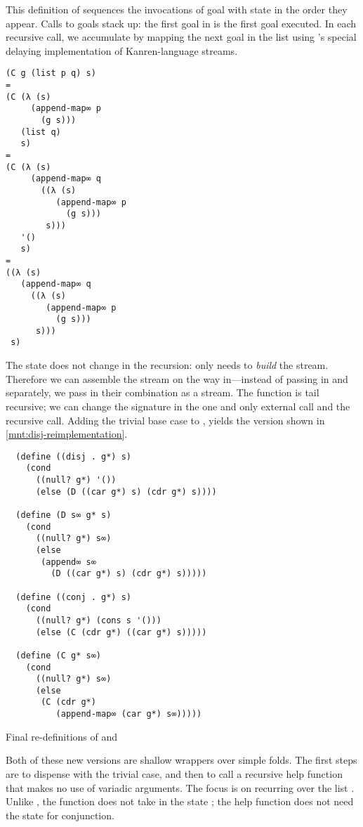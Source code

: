 \documentclass[sigplan,balance=true,pbalance=true,natbib=false]{acmart}
\begin{document}
This definition of  sequences the invocations of goal
with state in the order they appear. Calls to goals stack up: the
first goal in is the first goal executed. In each recursive call, we
accumulate by mapping the next goal in the list using
's special delaying implementation of
Kanren-language streams.

\begin{verbatim}
(C g (list p q) s)
=
(C (λ (s)
     (append-map∞ p
       (g s)))
   (list q)
   s)
=
(C (λ (s)
     (append-map∞ q
       ((λ (s)
          (append-map∞ p
            (g s)))
        s)))
   '()
   s)
=
((λ (s)
   (append-map∞ q
     ((λ (s)
        (append-map∞ p
          (g s)))
      s)))
 s)
\end{verbatim}

The state does not change in the recursion:  only needs
 to \emph{build} the stream. Therefore we can assemble
the stream on the way in---instead of passing in  and
 separately, we pass in their combination as a stream.
The function is tail recursive; we can change the signature in the one
and only external call and the recursive call. Adding the trivial base
case to , yields the version shown in
\cref{mnt:disj-reimplementation}.

\begin{listing}
\begin{verbatim}
  (define ((disj . g*) s)
    (cond
      ((null? g*) '())
      (else (D ((car g*) s) (cdr g*) s))))

  (define (D s∞ g* s)
    (cond
      ((null? g*) s∞)
      (else
       (append∞ s∞
         (D ((car g*) s) (cdr g*) s)))))

  (define ((conj . g*) s)
    (cond
      ((null? g*) (cons s '()))
      (else (C (cdr g*) ((car g*) s)))))

  (define (C g* s∞)
    (cond
      ((null? g*) s∞)
      (else
       (C (cdr g*)
          (append-map∞ (car g*) s∞)))))
\end{verbatim}
  \caption{Final re-definitions of  and }\label{mnt:disj-reimplementation}
\end{listing}

Both of these new versions are shallow wrappers over simple folds. The
first steps are to dispense with the trivial case, and then to call a
recursive help function that makes no use of variadic arguments. The
focus is on recurring over the list . Unlike
, the function  does not take in the state
; the help function does not need the state for
conjunction.
\end{document}

